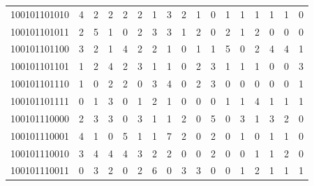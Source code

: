 \documentclass[10pt,a4paper]{article}
\begin{document}
\begin{longtable}{ |c|c|c|c|c|c|c|c|c|c|c|c|c|c|c|c|c| }
    100101101010              & 4                            & 2                                & 2                            & 2                              & 2   & 1   & 3   & 2   & 1   & 0   & 1   & 1   & 1   & 1   & 1   & 0   \\
    100101101011              & 2                            & 5                                & 1                            & 0                              & 2   & 3   & 3   & 1   & 2   & 0   & 2   & 1   & 2   & 0   & 0   & 0   \\
    100101101100              & 3                            & 2                                & 1                            & 4                              & 2   & 2   & 1   & 0   & 1   & 1   & 5   & 0   & 2   & 4   & 4   & 1   \\
    100101101101              & 1                            & 2                                & 4                            & 2                              & 3   & 1   & 1   & 0   & 2   & 3   & 1   & 1   & 1   & 0   & 0   & 3   \\
    100101101110              & 1                            & 0                                & 2                            & 2                              & 0   & 3   & 4   & 0   & 2   & 3   & 0   & 0   & 0   & 0   & 0   & 1   \\
    100101101111              & 0                            & 1                                & 3                            & 0                              & 1   & 2   & 1   & 0   & 0   & 0   & 1   & 1   & 4   & 1   & 1   & 1   \\
    100101110000              & 2                            & 3                                & 3                            & 0                              & 3   & 1   & 1   & 2   & 0   & 5   & 0   & 3   & 1   & 3   & 2   & 0   \\
    100101110001              & 4                            & 1                                & 0                            & 5                              & 1   & 1   & 7   & 2   & 0   & 2   & 0   & 1   & 0   & 1   & 1   & 0   \\
    100101110010              & 3                            & 4                                & 4                            & 4                              & 3   & 2   & 2   & 0   & 0   & 2   & 0   & 0   & 1   & 1   & 2   & 0   \\
    100101110011              & 0                            & 3                                & 2                            & 0                              & 2   & 6   & 0   & 3   & 3   & 0   & 0   & 1   & 2   & 1   & 1   & 1   \\

\end{longtable}
\end{document}
